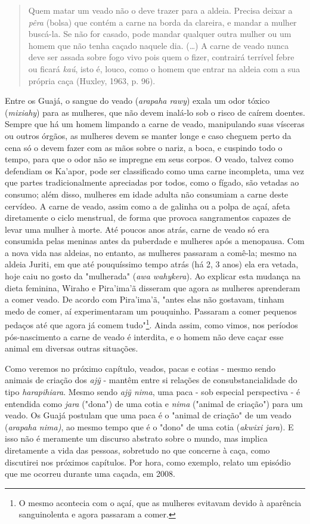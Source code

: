 \begin{quote}
Quem matar um veado não o deve trazer para a aldeia. Precisa deixar a
\emph{pêra} (bolsa) que contém a carne na borda da clareira, e mandar a
mulher buscá-la. Se não for casado, pode mandar qualquer outra mulher ou
um homem que não tenha caçado naquele dia. (\ldots{}) A carne de veado nunca
deve ser assada sobre fogo vivo pois quem o fizer, contrairá terrível
febre ou ficará \emph{kaú}, isto é, louco, como o homem que entrar na
aldeia com a sua própria caça (Huxley, 1963, p. 96).
\end{quote}

Entre os Guajá, o sangue do veado (\emph{arapaha rawy}) exala um odor
tóxico (\emph{mixiahy}) para as mulheres, que não devem inalá-lo sob o
risco de caírem doentes. Sempre que há um homem limpando a carne de
veado, manipulando suas vísceras ou outros órgãos, as mulheres devem se
manter longe e caso cheguem perto da cena só o devem fazer com as mãos
sobre o nariz, a boca, e cuspindo todo o tempo, para que o odor não se
impregne em seus corpos. O veado, talvez como defendiam os Ka'apor, pode
ser classificado como uma carne incompleta, uma vez que partes
tradicionalmente apreciadas por todos, como o fígado, são vetadas ao
consumo; além disso, mulheres em idade adulta não consumiam a carne
deste cervídeo. A carne de veado, assim como a de galinha ou a polpa de
açaí, afeta diretamente o ciclo menstrual, de forma que provoca
sangramentos capazes de levar uma mulher à morte. Até poucos anos atrás,
carne de veado só era consumida pelas meninas antes da puberdade e
mulheres após a menopausa. Com a nova vida nas aldeias, no entanto, as
mulheres passaram a comê-la; mesmo na aldeia Juriti, em que até
pouquíssimo tempo atrás (há 2, 3 anos) ela era vetada, hoje caiu no
gosto da "mulherada" (\emph{awa wahykera}). Ao explicar esta mudança na
dieta feminina, Wiraho e Pira'ima'ã disseram que agora as mulheres
aprenderam a comer veado. De acordo com Pira'ima'ã, "antes elas não
gostavam, tinham medo de comer, aí experimentaram um pouquinho. Passaram
a comer pequenos pedaços até que agora já comem tudo"\footnote{O mesmo
  acontecia com o açaí, que as mulheres evitavam devido à aparência
  sanguinolenta e agora passaram a comer.}. Ainda assim, como vimos, nos
períodos pós-nascimento a carne de veado é interdita, e o homem não deve
caçar esse animal em diversas outras situações.

Como veremos no próximo capítulo, veados, pacas e cotias - mesmo sendo
animais de criação dos \emph{ajỹ} - mantêm entre si relações de
consubstancialidade do tipo \emph{harapihiara}. Mesmo sendo \emph{ajỹ
nima}, uma paca - sob especial perspectiva - é entendida como
\emph{jara} ("dona") de uma cotia e \emph{nima} ("animal de criação")
para um veado. Os Guajá postulam que uma paca é o "animal de criação" de
um veado (\emph{arapaha nima)}, ao mesmo tempo que é o "dono" de uma
cotia (\emph{akwixi jara}). E isso não é meramente um discurso abstrato
sobre o mundo, mas implica diretamente a vida das pessoas, sobretudo no
que concerne à caça, como discutirei nos próximos capítulos. Por hora,
como exemplo, relato um episódio que me ocorreu durante uma caçada, em
2008.

